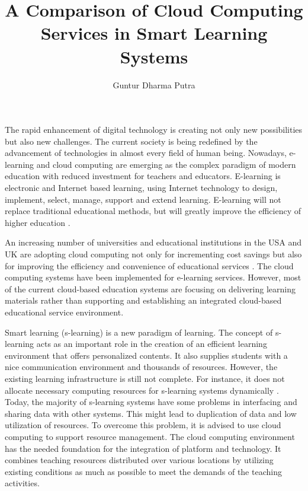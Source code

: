 \documentclass[journal]{vgtc}
\title{A Comparison of Cloud Computing Services in Smart Learning Systems}
\author{Guntur Dharma Putra}
\begin{document}
\maketitle

The rapid enhancement of digital technology is creating not only new possibilities but also new challenges. The current society is being redefined by the advancement of technologies in almost every field of human being. Nowadays, e-learning and cloud computing are emerging as the complex paradigm of modern education with reduced investment for teachers and educators. E-learning is electronic and Internet based learning, using Internet technology to design, implement, select, manage, support and extend learning. E-learning will not replace traditional educational methods, but will greatly improve the efficiency of higher education \cite{SudhirKumarSharmaNidhiGoyal2014}.

An increasing number of universities and educational institutions in the USA and UK are adopting cloud computing not only for incrementing cost savings but also for improving the efficiency and convenience of educational services \cite{jeong2013cloud}. The cloud computing systems have been implemented for e-learning services. However, most of the current cloud-based education systems are focusing on delivering learning materials rather than supporting and establishing an integrated cloud-based educational service environment.

Smart learning (s-learning) is a new paradigm of learning. The concept of s-learning acts as an important role in the creation of an efficient learning environment that offers personalized contents. It also supplies students with a nice communication environment and thousands of resources. However, the existing learning infrastructure is still not complete. For instance, it does not allocate necessary computing resources for s-learning systems dynamically \cite{Uden2007}. Today, the majority of s-learning systems have some problems in interfacing and sharing data with other systems. This might lead to duplication of data and low utilization of resources. To overcome this problem, it is advised to use cloud computing to support resource management. The cloud computing environment has the needed foundation for the integration of platform and technology. It combines teaching resources distributed over various locations by utilizing existing conditions as much as possible to meet the demands of the teaching activities.
\end{document}
